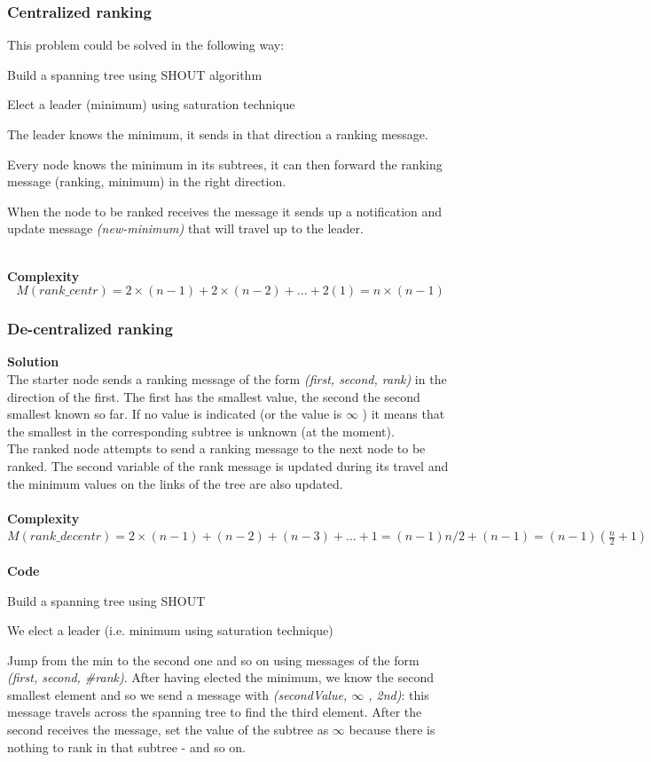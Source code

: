 \documentclass[paper=a4, fontsize=11pt]{scrartcl} %
\numberwithin{equation}{section} %
\numberwithin{figure}{section} %
\numberwithin{table}{section} %
\begin{document}
\subsubsection*{Centralized ranking}
This problem could be solved in the following way:
\begin{compactitem}
\item Build a spanning tree using SHOUT algorithm
\item Elect a leader (minimum) using saturation technique
\item The leader knows the minimum, it sends in that direction a ranking message.
\item Every node knows the minimum in its subtrees, it can then forward the ranking message (ranking, minimum) in the right direction.
\item When the node to be ranked receives the message it sends up a notification and update message \textit{(new-minimum)} that will travel up to the leader.
\end{compactitem}
~ \\
\textbf{Complexity}
$$M(rank\_centr) = 2\times(n-1)+ 2\times(n-2)+ ... + 2(1)= n\times(n-1)$$ 
\clearpage
\subsubsection*{De-centralized ranking}
\textbf{Solution}\\
The starter node sends a ranking message of the form \textit{(first, second, rank)} in the direction of the first. The first has the smallest value, the second the second smallest known so far. If no value is indicated (or the value is $\infty$ ) it means that the smallest in the corresponding subtree is unknown (at the moment).\\
The ranked node attempts to send a ranking message to the next node to be ranked. The second variable of the rank message is updated during its travel and the minimum values on the links of the tree are also updated.\\ ~ \\
\textbf{Complexity} \\ $M(rank\_decentr) = 2\times(n-1)+ (n-2)+ (n-3)+ ...+ 1= (n-1)n/2+ (n-1)= (n-1)(\frac{n}{2}+1)$ \\ ~ \\
\textbf{Code}
\begin{compactitem}
\item Build a spanning tree using SHOUT
\item We elect a leader (i.e. minimum using saturation technique)
\item Jump from the min to the second one and so on using messages of the form\\ \textit{(first, second, \#rank)}. After having elected the minimum, we know the second smallest element and so we send a message with \textit{(secondValue, $\infty$ , 2nd)}: this message travels across the spanning tree to find the third element. After the second receives the message, set the value of the subtree as $\infty$ because there is nothing to rank in that subtree - and so on. 
\end{compactitem}
~ 
\end{document}
